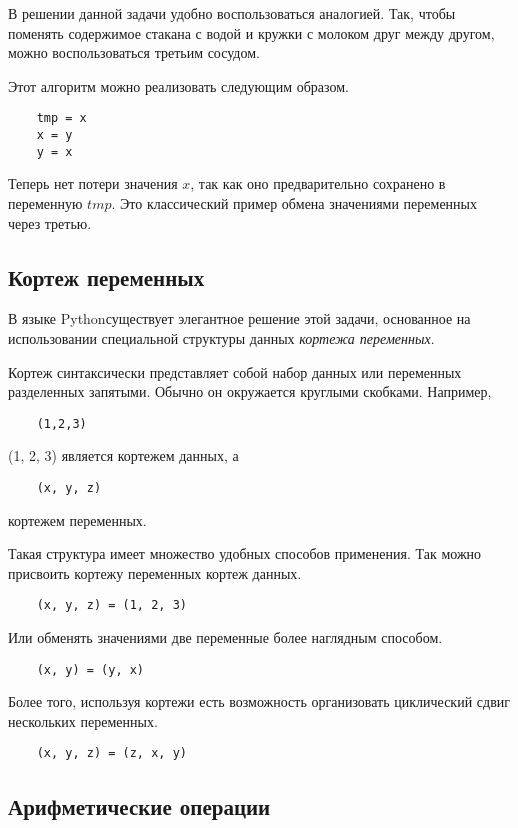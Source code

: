 \documentclass[a4paper, fleqn]{article}
\newcommand*{\py}{Python}
\begin{document}
	В решении данной задачи удобно воспользоваться аналогией. Так, чтобы поменять содержимое стакана с водой и кружки с молоком друг между другом, можно воспользоваться третьим сосудом.
	
	Этот алгоритм можно реализовать следующим образом.
	\begin{lstlisting}
	tmp = x
	x = y
	y = x
	\end{lstlisting}
	Теперь нет потери значения $x$, так как оно предварительно сохранено в переменную $tmp$. Это классический пример обмена значениями переменных через третью.
	
	\subsection*{Кортеж переменных}
	
	В языке \py существует элегантное решение этой задачи, основанное на использовании специальной структуры данных \emph{кортежа переменных}.
	
	Кортеж синтаксически представляет собой набор данных или переменных разделенных запятыми. Обычно он окружается круглыми скобками. Например,
	\begin{lstlisting}
	(1,2,3)
	\end{lstlisting}
	(1, 2, 3)
	является кортежем данных, а
	\begin{lstlisting}
	(x, y, z)
	\end{lstlisting}
	кортежем переменных.
	
	Такая структура имеет множество удобных способов применения. Так можно присвоить кортежу переменных кортеж данных.
	\begin{lstlisting}
	(x, y, z) = (1, 2, 3)
	\end{lstlisting}
	
	Или обменять значениями две переменные более наглядным способом.
	\begin{lstlisting}
	(x, y) = (y, x)
	\end{lstlisting}
	
	Более того, используя кортежи есть возможность организовать циклический сдвиг нескольких переменных.
	\begin{lstlisting}
	(x, y, z) = (z, x, y)
	\end{lstlisting}
	
	
	\subsection*{Арифметические операции}
	
\end{document}
